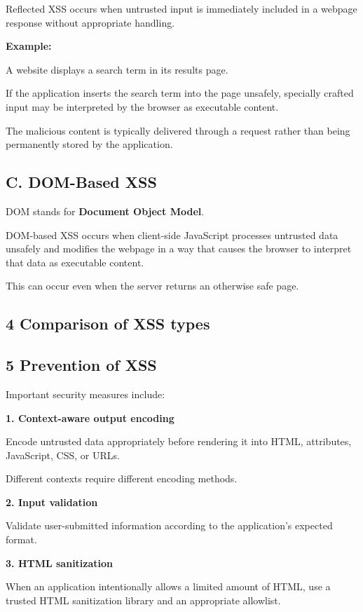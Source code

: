 Reflected XSS occurs when untrusted input is immediately included in a webpage response without appropriate handling.

\textbf{Example:}

A website displays a search term in its results page.

If the application inserts the search term into the page unsafely, specially crafted input may be interpreted by the browser as executable content.

The malicious content is typically delivered through a request rather than being permanently stored by the application.

\subsection{C. DOM-Based XSS}

DOM stands for \textbf{Document Object Model}.

DOM-based XSS occurs when client-side JavaScript processes untrusted data unsafely and modifies the webpage in a way that causes the browser to interpret that data as executable content.

This can occur even when the server returns an otherwise safe page.

\subsection{4 Comparison of XSS types}


\subsection{5 Prevention of XSS}

Important security measures include:

\textbf{1. Context-aware output encoding}

Encode untrusted data appropriately before rendering it into HTML, attributes, JavaScript, CSS, or URLs.

Different contexts require different encoding methods.

\textbf{2. Input validation}

Validate user-submitted information according to the application's expected format.

\textbf{3. HTML sanitization}

When an application intentionally allows a limited amount of HTML, use a trusted HTML sanitization library and an appropriate allowlist.

